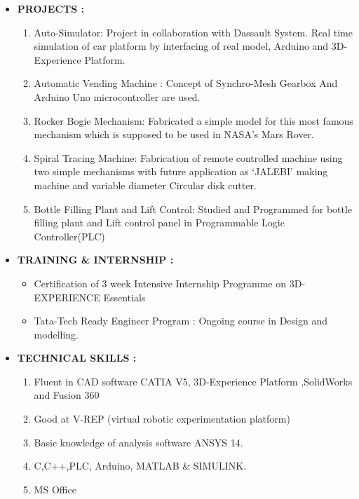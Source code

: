 \documentclass[11pt]{article}
\begin{document}
\begin{itemize}[label=$\star$]
	 \bigskip
	\item	\begin{large} \textbf{PROJECTS :} \end{large}
	\begin{enumerate}
		\itemsep0em
		\item Auto-Simulator: Project in collaboration with Dassault System. Real time simulation of car platform by interfacing of real model, Arduino and 3D-Experience Platform. 
		\item Automatic Vending Machine : Concept of Synchro-Mesh Gearbox And Arduino Uno microcontroller are used.
		\item Rocker Bogie Mechanism: Fabricated a simple model for this most famous mechanism which is supposed to be used in NASA’s Mars Rover.
		\item Spiral Tracing Machine: Fabrication of remote controlled machine using two simple mechanisms with future application as ‘JALEBI’ making machine and variable diameter Circular disk cutter.
		\item Bottle Filling Plant and Lift Control: Studied and Programmed for bottle filling plant and Lift control panel in Programmable Logic Controller(PLC)
	\end{enumerate}
\bigskip
	\item	\begin{large} \textbf{TRAINING \& INTERNSHIP :} \end{large}
\begin{itemize}[label=$\bullet$]
	\itemsep0em
	\item Certification of 3 week Intensive Internship Programme on 3D-EXPERIENCE Essentials 
	\item Tata-Tech Ready Engineer Program : Ongoing course in Design and modelling.
\end{itemize}

 \bigskip
\item	\begin{large} \textbf{TECHNICAL SKILLS :} \end{large}
\begin{enumerate}
	\itemsep0em
	\item Fluent in CAD software CATIA V5, 3D-Experience Platform ,SolidWorks and Fusion 360 
	\item Good at V-REP (virtual robotic experimentation platform)
	\item Basic knowledge of analysis software ANSYS 14.
	\item C,C++,PLC, Arduino, MATLAB \& SIMULINK.
	\item MS Office
\end{enumerate}
	
\end{itemize}
\end{document}

